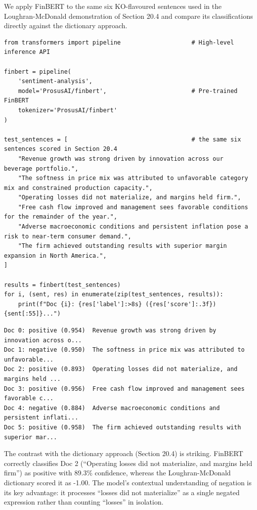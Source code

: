 We apply FinBERT to the same six KO-flavoured sentences used in the Loughran-McDonald demonstration of Section 20.4 and compare its classifications directly against the dictionary approach.

\begin{verbatim}
from transformers import pipeline                    # High-level inference API

finbert = pipeline(
    'sentiment-analysis',
    model='ProsusAI/finbert',                        # Pre-trained FinBERT
    tokenizer='ProsusAI/finbert'
)

test_sentences = [                                   # the same six sentences scored in Section 20.4
    "Revenue growth was strong driven by innovation across our beverage portfolio.",
    "The softness in price mix was attributed to unfavorable category mix and constrained production capacity.",
    "Operating losses did not materialize, and margins held firm.",
    "Free cash flow improved and management sees favorable conditions for the remainder of the year.",
    "Adverse macroeconomic conditions and persistent inflation pose a risk to near-term consumer demand.",
    "The firm achieved outstanding results with superior margin expansion in North America.",
]

results = finbert(test_sentences)
for i, (sent, res) in enumerate(zip(test_sentences, results)):
    print(f"Doc {i}: {res['label']:>8s} ({res['score']:.3f})  {sent[:55]}...")
\end{verbatim}

\begin{verbatim}
Doc 0: positive (0.954)  Revenue growth was strong driven by innovation across o...
Doc 1: negative (0.950)  The softness in price mix was attributed to unfavorable...
Doc 2: positive (0.893)  Operating losses did not materialize, and margins held ...
Doc 3: positive (0.956)  Free cash flow improved and management sees favorable c...
Doc 4: negative (0.884)  Adverse macroeconomic conditions and persistent inflati...
Doc 5: positive (0.958)  The firm achieved outstanding results with superior mar...
\end{verbatim}

The contrast with the dictionary approach (Section 20.4) is striking. FinBERT correctly classifies Doc 2 (``Operating losses did not materialize, and margins held firm'') as positive with 89.3\% confidence, whereas the Loughran-McDonald dictionary scored it as -1.00. The model's contextual understanding of negation is its key advantage: it processes ``losses did not materialize'' as a single negated expression rather than counting ``losses'' in isolation.

